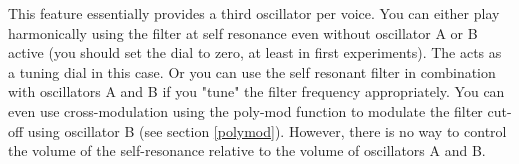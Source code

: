 This feature essentially provides a third oscillator per voice. You can either play harmonically using the filter at self resonance even without oscillator A or B active (you should set the \filterenv dial to zero, at least in first experiments). The \filtercutoff acts as a tuning dial in this case. Or you can use the self resonant filter in combination with oscillators A and B if you "tune" the filter frequency appropriately. You can even use cross-modulation using the poly-mod function to modulate the filter cut-off using oscillator B (see section \ref{polymod}). However, there is no way to control the volume of the self-resonance relative to the volume of oscillators A and B.   
